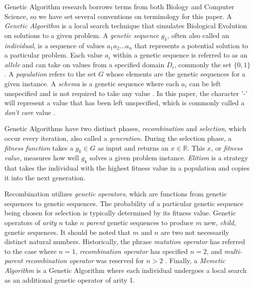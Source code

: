 Genetic Algorithm research borrows terms from both Biology and Computer Science, so we have set several conventions on terminology for this paper. A \emph{Genetic Algorithm} is a local search technique that simulates Biological Evolution on solutions to a given problem\cite{Russell10}. A \emph{genetic sequence} $g_k$, often also called an \emph{individual}, is a sequence of values $a_1 a_2\ldots a_n$ that represents a potential solution to a particular problem. Each value $a_i$ within a genetic sequence is referred to as an \emph{allele} and can take on values from a specified domain $D_i$, commonly the set $\{0,1\}$. A \emph{population} refers to the set $G$ whose elements are the genetic sequences for a given instance. A \emph{schema} is a genetic sequence where each $a_i$ can be left unspecified and is not required to take any value \cite{Russell10}. In this paper, the character '-' will represent a value that has been left unspecified, which is commonly called a \emph{don't care} value \cite{Holland75}.

Genetic Algorithms have two distinct phases, \emph{recombination} and \emph{selection}, which occur every iteration, also called a \emph{generation}. During the selection phase, a \emph{fitness function} takes a $g_k \in G$ as input and returns an $x \in \mathbb{R}$. This $x$, or \emph{fitness value}, measures how well $g_k$ solves a given problem instance. \emph{Elitism} is a strategy that takes the individual with the highest fitness value in a population and copies it into the next generation.

Recombination utilizes \emph{genetic operators}, which are functions from genetic sequences to genetic sequences. The probability of a particular genetic sequence being chosen for selection is typically determined by its fitness value. Genetic operators of \emph{arity} $n$ take $n$ \emph{parent} genetic sequences to produce $m$ new, \emph{child}, genetic sequences. It should be noted that $m$ and $n$ are two not necessarily distinct natural numbers.  Historically, the phrase \emph{mutation operator} has referred to the case where $n = 1$, \emph{recombination operator} has specified $n = 2$, and \emph{multi-parent recombination operator} was reserved for $n > 2$ \cite{Eiben94}. Finally, a \emph{Memetic Algorithm} is a Genetic Algorithm where each individual undergoes a local search as an additional genetic operator of arity 1.